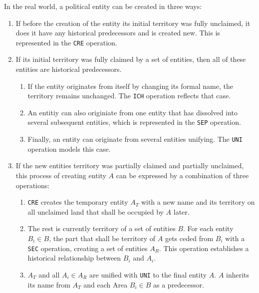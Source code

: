 In the real world, a political entity can be created in three ways:
\begin{enumerate}
  \item If before the creation of the entity its initial territory was fully unclaimed, it does it have any historical predecessors and is created new. This is represented in the \texttt{CRE} operation.
  \item If its initial territory was fully claimed by a set of entities, then all of these entities are historical predecessors.
  \begin{enumerate}
    \item If the entity originates from itself by changing its formal name, the territory remains unchanged. The \texttt{ICH} operation reflects that case.
    \item An entitiy can also originiate from one entity that has dissolved into several subsequent entities, which is represented in the \texttt{SEP} operation.
    \item Finally, an entity can originate from several entities unifying. The \texttt{UNI} operation models this case.
  \end{enumerate}
  \item If the new entities territory was partially claimed and partially unclaimed, this process of creating entity $A$ can be expressed by a combination of three operations:
  \begin{enumerate}
    \item \texttt{CRE} creates the temporary entity $A_T$ with a new name and its territory on all unclaimed land that shall be occupied by $A$ later.
    \item The rest is currently territory of a set of entities $B$. For each entity $B_i \in B$, the part that shall be territory of $A$ gets ceded from $B_i$ with a \texttt{SEC} operation, creating a set of entities $A_R$. This operation establishes a historical relationship between $B_i$ and $A_i$.
    \item $A_T$ and all $A_i \in A_R$ are unified with \texttt{UNI} to the final entity $A$. $A$ inherits its name from $A_T$ and each Area $B_i \in B$ as a predecessor.
  \end{enumerate}
\end{enumerate}

